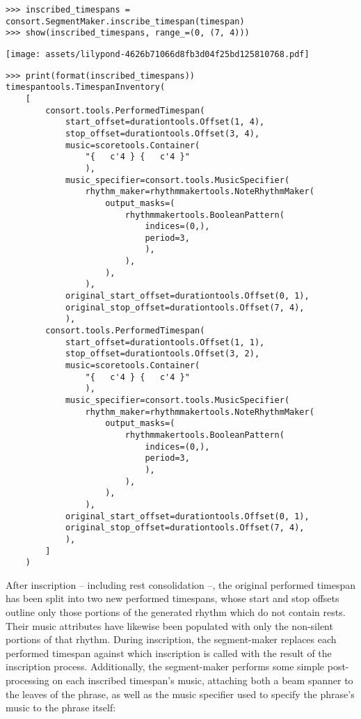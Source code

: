 \begin{abjadbookoutput}
\begin{singlespacing}
\vspace{-0.5\baselineskip}
\begin{lstlisting}
>>> inscribed_timespans = consort.SegmentMaker.inscribe_timespan(timespan)
>>> show(inscribed_timespans, range_=(0, (7, 4)))
\end{lstlisting}
\noindent\texttt{[image: assets/lilypond-4626b71066d8fb3d04f25bd125810768.pdf]}
\begin{lstlisting}
>>> print(format(inscribed_timespans))
timespantools.TimespanInventory(
    [
        consort.tools.PerformedTimespan(
            start_offset=durationtools.Offset(1, 4),
            stop_offset=durationtools.Offset(3, 4),
            music=scoretools.Container(
                "{   c'4 } {   c'4 }"
                ),
            music_specifier=consort.tools.MusicSpecifier(
                rhythm_maker=rhythmmakertools.NoteRhythmMaker(
                    output_masks=(
                        rhythmmakertools.BooleanPattern(
                            indices=(0,),
                            period=3,
                            ),
                        ),
                    ),
                ),
            original_start_offset=durationtools.Offset(0, 1),
            original_stop_offset=durationtools.Offset(7, 4),
            ),
        consort.tools.PerformedTimespan(
            start_offset=durationtools.Offset(1, 1),
            stop_offset=durationtools.Offset(3, 2),
            music=scoretools.Container(
                "{   c'4 } {   c'4 }"
                ),
            music_specifier=consort.tools.MusicSpecifier(
                rhythm_maker=rhythmmakertools.NoteRhythmMaker(
                    output_masks=(
                        rhythmmakertools.BooleanPattern(
                            indices=(0,),
                            period=3,
                            ),
                        ),
                    ),
                ),
            original_start_offset=durationtools.Offset(0, 1),
            original_stop_offset=durationtools.Offset(7, 4),
            ),
        ]
    )
\end{lstlisting}
\end{singlespacing}
\end{abjadbookoutput}

\noindent After inscription -- including rest consolidation --, the original
performed timespan has been split into two new performed timespans, whose start
and stop offsets outline only those portions of the generated rhythm which do
not contain rests. Their music attributes have likewise been populated with
only the non-silent portions of that rhythm. During inscription, the
segment-maker replaces each performed timespan against which inscription is
called with the result of the inscription process. Additionally, the
segment-maker performs some simple post-processing on each inscribed timespan's
music, attaching both a beam spanner to the leaves of the phrase, as well as
the music specifier used to specify the phrase's music to the phrase itself:

